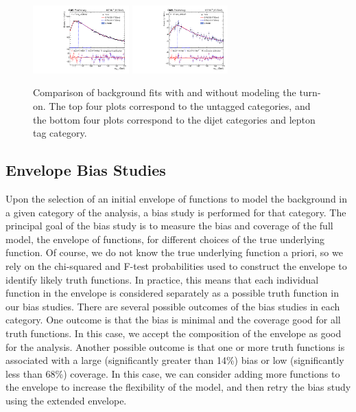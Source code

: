 \begin{figure}
\begin{center}
        \includegraphics[width=0.33\textwidth]{fig/turnon_comparison/plot_cat503_prefit_new.pdf}
        \includegraphics[width=0.33\textwidth]{fig/turnon_comparison/over_plot6789_prefit_new.pdf}
        \caption{Comparison of background fits with and without modeling the turn-on. 
        The top four plots correspond to the untagged categories, and the bottom four plots correspond to the dijet categories and lepton tag category.}
		\label{fig:compare_turnon_fits}
	\end{center}
\end{figure}

\subsection{Envelope Bias Studies}\label{sec:envelope_bias_studies}
Upon the selection of an initial envelope of functions to model the background in a 
given category of the analysis, a bias study is performed for that category. 
The principal goal of the bias study is to measure the bias and coverage of the 
full model, the envelope of functions, for different choices of the true 
underlying function. Of course, we do not know the true underlying function a priori, so 
we rely on the chi-squared and F-test probabilities used to construct the 
envelope to identify likely truth functions. In practice, this means that each 
individual function in the envelope is considered separately as a possible truth function
in our bias studies. There are several possible outcomes of the bias studies in each 
category. One outcome is that the bias is minimal and the coverage good for all 
truth functions. In this case, we accept the composition of the envelope as good 
for the analysis. Another possible outcome is that one or more truth functions is 
associated with a large (significantly greater than 14\%) bias or low 
(significantly less than 68\%) coverage. In this case, we can consider adding 
more functions to the envelope to increase the flexibility of the model, and then 
retry the bias study using the extended envelope. 

